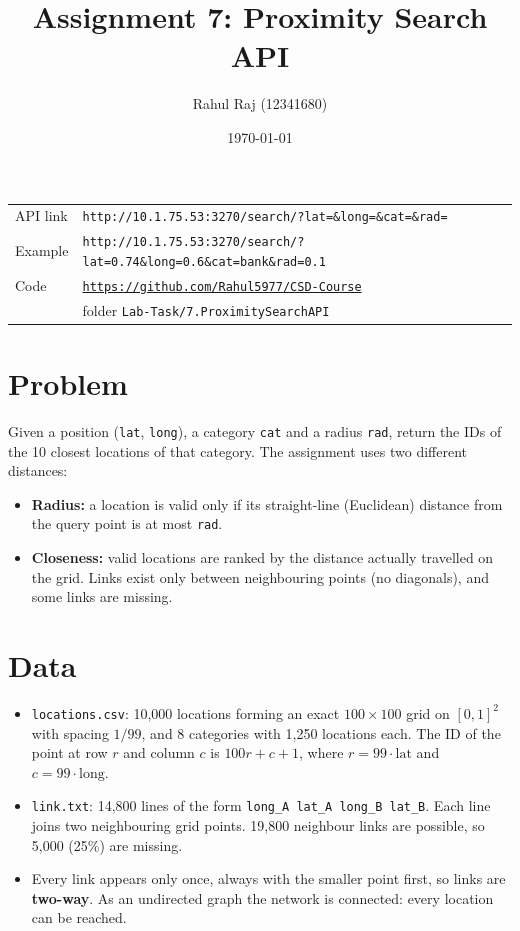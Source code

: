 \documentclass[11pt,a4paper]{article}
\title{\textbf{Assignment 7: Proximity Search API}}
\author{Rahul Raj \quad (12341680)}
\date{\today}
\newcommand{\api}{http://10.1.75.53:3270}
\begin{document}
\maketitle

\begin{center}
\begin{tabular}{ll}
\toprule
API link & \texttt{\api/search/?lat=\&long=\&cat=\&rad=} \\
Example & \texttt{\api/search/?lat=0.74\&long=0.6\&cat=bank\&rad=0.1} \\
Code & \href{https://github.com/Rahul5977/CSD-Course/tree/main/Lab-Task/7.ProximitySearchAPI}{\texttt{https://github.com/Rahul5977/CSD-Course}} \\
 & folder \texttt{Lab-Task/7.ProximitySearchAPI} \\
\bottomrule
\end{tabular}
\end{center}

\section{Problem}

Given a position (\texttt{lat}, \texttt{long}), a category \texttt{cat} and a radius \texttt{rad}, return the
IDs of the 10 closest locations of that category. The assignment uses two different distances:

\begin{itemize}
  \item \textbf{Radius:} a location is valid only if its straight-line (Euclidean) distance from the query
        point is at most \texttt{rad}.
  \item \textbf{Closeness:} valid locations are ranked by the distance actually travelled on the grid.
        Links exist only between neighbouring points (no diagonals), and some links are missing.
\end{itemize}

\section{Data}

\begin{itemize}
  \item \texttt{locations.csv}: 10,000 locations forming an exact $100\times100$ grid on $[0,1]^2$ with
        spacing $1/99$, and 8 categories with 1,250 locations each. The ID of the point at row $r$ and
        column $c$ is $100r + c + 1$, where $r = 99\cdot\text{lat}$ and $c = 99\cdot\text{long}$.
  \item \texttt{link.txt}: 14,800 lines of the form \texttt{long\_A lat\_A long\_B lat\_B}. Each line joins
        two neighbouring grid points. 19,800 neighbour links are possible, so 5,000 (25\%) are missing.
  \item Every link appears only once, always with the smaller point first, so links are \textbf{two-way}.
        As an undirected graph the network is connected: every location can be reached.
\end{itemize}
\end{document}
